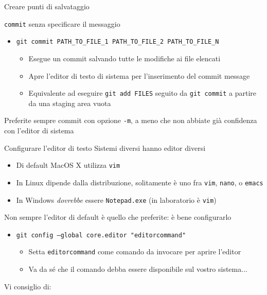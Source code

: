 \documentclass[xcolor=dvipsnames,presentation]{beamer}
\begin{document}
\begin{frame}{Creare punti di salvataggio}
\begin{block}{\texttt{commit} senza specificare il messaggio}
\begin{itemize}
\begin{itemize}
                \item Apre l'editor di testo di sistema per l'inserimento del commit message
            \end{itemize}
            \item \texttt{git commit PATH\_TO\_FILE\_1 PATH\_TO\_FILE\_2 PATH\_TO\_FILE\_N}
            \begin{itemize}
                \footnotesize
                \item Esegue un commit salvando tutte le modifiche ai file elencati
                \item Apre l'editor di testo di sistema per l'inserimento del commit message
                \item Equivalente ad eseguire \texttt{git add FILES} seguito da \texttt{git commit}
a partire da una staging area vuota
            \end{itemize}
        \end{itemize}
        Preferite sempre commit con opzione \texttt{-m}, a meno che non abbiate già confidenza con
l'editor di sistema
    \end{block}
    \begin{block}{Configurare l'editor di testo}
        Sistemi diversi hanno editor diversi
        \begin{itemize}
            \item Di default MacOS X utilizza \texttt{vim}
            \item In Linux dipende dalla distribuzione, solitamente è uno fra \texttt{vim},
\texttt{nano}, o \texttt{emacs}
            \item In Windows \textit{dovrebbe} essere \texttt{Notepad.exe} (in laboratorio è
\texttt{vim})
        \end{itemize}
        Non sempre l'editor di default è quello che preferite: è bene configurarlo
        \begin{itemize}
            \item \texttt{git config --global core.editor "editorcommand"}
            \begin{itemize}
                \item Setta \texttt{editorcommand} come comando da invocare per aprire l'editor
                \item Va da sé che il comando debba essere disponibile sul vostro sistema...
            \end{itemize}
        \end{itemize}
        Vi consiglio di:
        \begin{itemize}

\end{itemize}
\end{block}
\end{frame}
\end{document}
